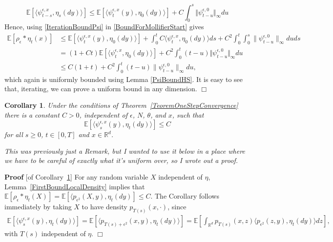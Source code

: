 \documentclass[12pt]{article}
\newenvironment {proof}{{\noindent\bf Proof }}{\hfill $\Box$ \medskip}
\newtheorem{corollary}[theorem]{Corollary}
\newcommand{\IE}{\mathbb E}
\newcommand{\IR}{\mathbb R}
\newcommand{\comment}[1]{{\color{blue} \it #1}}
\begin{document}
\begin{proof}
    \begin{equation} \label{IterationBoundPsi}
        \IE[\langle \psi_{t-s}^{\epsilon,x}, \eta_s(dy)\rangle]
        \leq
        \IE[\langle \psi_{t}^{\epsilon,x}(y), \eta_0(dy) \rangle]
        +
        C \int_0^s \Vert \psi_{t-u}^{\epsilon,0} \Vert_\infty du
    \end{equation}
    Hence, using \eqref{IterationBoundPsi} in \eqref{BoundForMollifierStart} gives
    \begin{align*}
        \IE[ \rho_\epsilon * \eta_t(x) ]
        &\leq
        \IE[ \langle \psi_t^{\epsilon,x}(y), \eta_0(dy) \rangle]
        +
        \int_0^t C\langle \psi_{t}^{\epsilon,x}, \eta_0(dy)\rangle ds
        +
        C^2 \int_0^t \int_0^s  \| \psi_{t-u}^{\epsilon,0} \|_\infty du ds
        \\ &=
        (1+Ct) \IE[ \langle \psi_t^{\epsilon,x}, \eta_0(dy) \rangle]
        +
        C^2 \int_0^t (t-u) \Vert \psi_{t-u}^{\epsilon,0} \Vert_\infty du
        \\ &\leq
        C(1+t) + C^2 \int_0^t (t-u) \| \psi_{t-u}^{\epsilon,0} \|_\infty du ,
    \end{align*}
    which again is uniformly bounded using Lemma \ref{PsiBoundHS}.
    It is easy to see that, iterating, we can prove a uniform bound in any dimension. 
\end{proof}

\begin{corollary} \label{cor:BoundLocalDensity}
    Under the conditions of Theorem~\ref{TeoremOneStepConvergence}
    there is a constant $C > 0$,
    independent of $\epsilon$, $N$, $\theta$, and $x$,
    such that
    \[
        \IE[ \langle \psi^{\epsilon,x}_s(y), \eta_t(dy) \rangle ]
        \le C
    \]
    for all $s \ge 0$, $t \in [0, T]$ and $x \in \IR^d$.
\end{corollary}

\comment{This was previously just a Remark, but I wanted to use it below
    in a place where we have to be careful of exactly what it's uniform over,
    so I wrote out a proof.}

\begin{proof}[of Corollary~\ref{cor:BoundLocalDensity}]
    For any random variable $X$ independent of $\eta$,
    Lemma~\ref{FirstBoundLocalDensity} implies that
    $\IE[\rho_\epsilon * \eta_t(X)] = \IE[\langle p_{\epsilon^2}(X, y), \eta_t(dy)] \le C$.
    The Corollary follows immediately 
    by taking $X$ to have density $p_{T(s)}(x, \cdot)$, since
    \begin{align*}
        \IE[ \langle \psi^{\epsilon,x}_s(y), \eta_t(dy)\rangle ]
        =
        \IE[ \langle p_{T(s)+\epsilon^2}(x,y), \eta_t(dy) \rangle ]
        =
        \IE\left[ \int_{\IR^d} 
            p_{T(s)}(x, z)
            \langle p_{\epsilon^2}(z, y), \eta_t(dy) \rangle
        dz \right] ,
    \end{align*}
    with $T(s)$ independent of $\eta$.
\end{proof}
\end{document}
